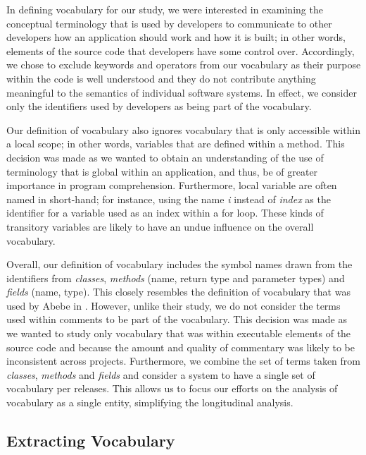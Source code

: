 In defining vocabulary for our study, we were interested in examining the conceptual terminology that is used by developers to communicate to other developers how an application should work and how it is built; in other words, elements of the source code that developers have some control over. Accordingly, we chose to exclude keywords and operators from our vocabulary as their purpose within the code is well understood and they do not contribute anything meaningful to the semantics of individual software systems. In effect, we consider only the identifiers used by developers as being part of the vocabulary.

Our definition of vocabulary also ignores vocabulary that is only accessible within a local scope; in other words, variables that are defined within a method. This decision was made as we wanted to obtain an understanding of the use of terminology that is global within an application, and thus, be of greater importance in program comprehension. Furthermore, local variable are often named in short-hand; for instance, using the name \emph{i} instead of \emph{index} as the identifier for a variable used as an index within a for loop. These kinds of transitory variables are likely to have an undue influence on the overall vocabulary.

Overall, our definition of vocabulary includes the symbol names drawn from the identifiers from \emph{classes}, \emph{methods} (name, return type and parameter types) and \emph{fields} (name, type). This closely resembles the definition of vocabulary that was used by Abebe \etal in \cite{Abebe09a}. However, unlike their study, we do not consider the terms used within comments to be part of the vocabulary. This decision was made as we wanted to study only vocabulary that was within executable elements of the source code and because the amount and quality of commentary was likely to be inconsistent across projects. Furthermore, we combine the set of terms taken from \emph{classes}, \emph{methods} and \emph{fields} and consider a system to have a single set of vocabulary per releases. This allows us to focus our efforts on the analysis of vocabulary as a single entity, simplifying the longitudinal analysis.



\subsection{Extracting Vocabulary} %
\label{sub:extracting_vocabulary}

